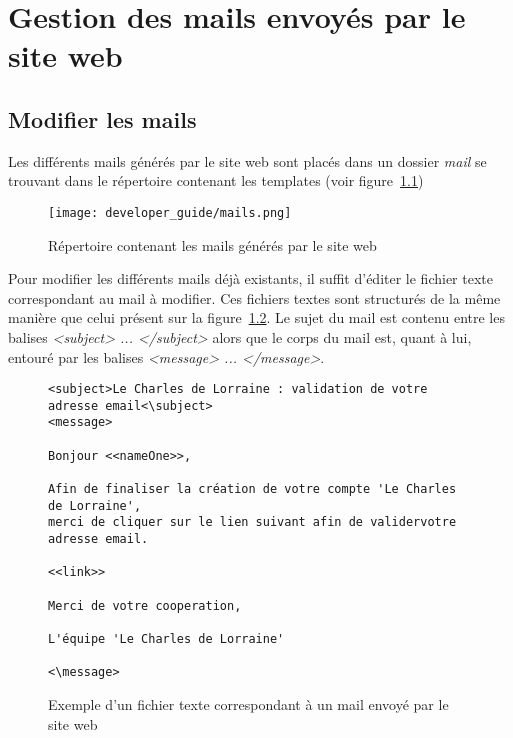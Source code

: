 \chapter{Gestion des mails envoyés par le site web}
\label{gestion des mails}

\section{Modifier les mails}

Les différents mails générés par le site web sont placés dans un dossier \textit{mail} se trouvant dans le répertoire contenant les templates (voir figure~\ref{fig:Répertoire contenant les mails générés par le site web})

\begin{figure}[!ht]
    \centering
    \texttt{[image: developer\_guide/mails.png]}
    \caption{Répertoire contenant les mails générés par le site web}
    \label{fig:Répertoire contenant les mails générés par le site web}
\end{figure}
\FloatBarrier

Pour modifier les différents mails déjà existants, il suffit d'éditer le fichier texte correspondant au mail à modifier. Ces fichiers textes sont structurés de la même manière que celui présent sur la figure~\ref{fig:Exemple d'un fichier texte correspondant à un mail envoyé par le site web}. Le sujet du mail est contenu entre les balises \textit{<subject> ... </subject>} alors que le corps du mail est, quant à lui, entouré par les balises \textit{<message> ... </message>}.

\begin{figure}[!ht]
\begin{framed}
\begin{verbatim}
<subject>Le Charles de Lorraine : validation de votre adresse email<\subject>
<message>

Bonjour <<nameOne>>,

Afin de finaliser la création de votre compte 'Le Charles de Lorraine',  
merci de cliquer sur le lien suivant afin de validervotre adresse email.

<<link>>
	
Merci de votre cooperation,

L'équipe 'Le Charles de Lorraine'

<\message>
\end{verbatim}
\end{framed}
    \caption{Exemple d'un fichier texte correspondant à un mail envoyé par le site web}
    \label{fig:Exemple d'un fichier texte correspondant à un mail envoyé par le site web}
\end{figure}
\FloatBarrier

